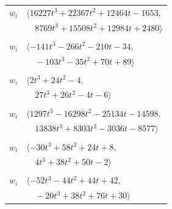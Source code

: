 \documentclass[11pt]{article}
\begin{document}
\begin{longtable}{@{}ll@{}}
$w_i$ & $\langle 16227t^{3}+22367t^{2}+12464t-1653,$\\
 & $\quad 8769t^{3}+15508t^{2}+12984t+2480\rangle$\\
\addlinespace[2pt]
\multicolumn{2}{@{}p{0.97\textwidth}@{}}{$i=17$, $D_i=4$, $\rho_{ij}$: $10{:}2, \allowbreak 11{:}1, \allowbreak 13{:}2, \allowbreak 34{:}1, \allowbreak 35{:}2, \allowbreak 38{:}1, \allowbreak 40{:}1, \allowbreak 45{:}2, \allowbreak 47{:}2, \allowbreak 53{:}1, \allowbreak 66{:}1$}\\
$w_i$ & $\langle -141t^{3}-266t^{2}-210t-34,$\\
 & $\quad -103t^{3}-35t^{2}+70t+89\rangle$\\
\addlinespace[2pt]
\multicolumn{2}{@{}p{0.97\textwidth}@{}}{$i=18$, $D_i=4$, $\rho_{ij}$: $10{:}2, \allowbreak 19{:}2, \allowbreak 29{:}2, \allowbreak 31{:}2, \allowbreak 32{:}2, \allowbreak 35{:}2, \allowbreak 41{:}1, \allowbreak 65{:}2$}\\
$w_i$ & $\langle 2t^{3}+24t^{2}-4,$\\
 & $\quad 27t^{3}+26t^{2}-4t-6\rangle$\\
\addlinespace[2pt]
\multicolumn{2}{@{}p{0.97\textwidth}@{}}{$i=19$, $D_i=32$, $\rho_{ij}$: $2{:}1, \allowbreak 18{:}1, \allowbreak 30{:}1, \allowbreak 32{:}2, \allowbreak 34{:}1, \allowbreak 36{:}2, \allowbreak 40{:}2, \allowbreak 43{:}1, \allowbreak 52{:}2, \allowbreak 60{:}2, \allowbreak 66{:}2, \allowbreak 68{:}1, \allowbreak 71{:}1$}\\
$w_i$ & $\langle 1297t^{3}-16298t^{2}-25134t-14598,$\\
 & $\quad 13838t^{3}+8303t^{2}-3036t-8577\rangle$\\
\addlinespace[2pt]
\multicolumn{2}{@{}p{0.97\textwidth}@{}}{$i=20$, $D_i=4$, $\rho_{ij}$: $3{:}1, \allowbreak 6{:}2, \allowbreak 29{:}2, \allowbreak 32{:}2, \allowbreak 59{:}2, \allowbreak 65{:}2, \allowbreak 67{:}1, \allowbreak 72{:}2, \allowbreak 73{:}2$}\\
$w_i$ & $\langle -30t^{3}+58t^{2}+24t+8,$\\
 & $\quad 4t^{3}+38t^{2}+50t-2\rangle$\\
\addlinespace[2pt]
\multicolumn{2}{@{}p{0.97\textwidth}@{}}{$i=21$, $D_i=2$, $\rho_{ij}$: $7{:}2, \allowbreak 10{:}2, \allowbreak 38{:}1, \allowbreak 57{:}1, \allowbreak 60{:}2, \allowbreak 63{:}1, \allowbreak 71{:}2, \allowbreak 73{:}1$}\\
$w_i$ & $\langle -52t^{3}-44t^{2}+44t+42,$\\
 & $\quad -20t^{3}+38t^{2}+76t+30\rangle$\\

\end{longtable}
\end{document}
